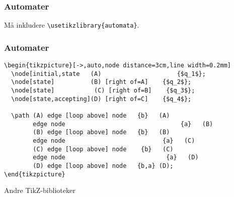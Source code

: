 \documentclass{beamer}
\begin{document}
\begin{frame}[fragile]
\frametitle{Automater}


\begin{center}
\end{center}

Må inkludere \texttt{\textbackslash usetikzlibrary\{automata\}}.

\end{frame}

\begin{frame}[fragile]
\frametitle{Automater}


\begin{Verbatim}[fontsize=\footnotesize, frame=single]
\begin{tikzpicture}[->,auto,node distance=3cm,line width=0.2mm]
  \node[initial,state   (A) 	          	    {$q_1$};
  \node[state]          (B) [right of=A]    {$q_2$};
  \node[state]	         (C) [right of=B]    {$q_3$};
  \node[state,accepting](D) [right of=C]    {$q_4$};

  \path (A) edge [loop above] node 	 {b}   (A)
	    edge node      			                 {a}   (B)
        (B) edge [loop above] node 	 {b}   (B)
	    edge node   	                    {a}   (C)
        (C) edge [loop above] node	  {b}   (C)
	    edge node 	    	                 {a}   (D)
        (D) edge [loop above] node 	 {b,a} (D);
\end{tikzpicture}
\end{Verbatim}

\end{frame}


\begin{frame}[fragile]
\begin{center}
\Huge{Andre TikZ-biblioteker}
\end{center}
\end{frame}
\end{document}
